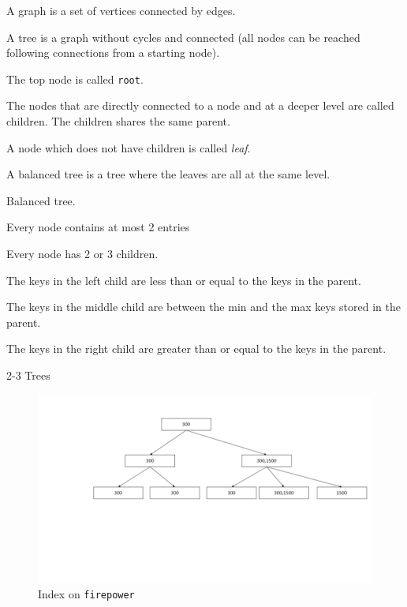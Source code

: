 \documentclass{beamer}
\begin{document}
\begin{slide}{
\item A graph is a set of vertices connected by edges.
\item A tree is a graph without cycles and connected (all nodes can be reached following connections from a starting node).
\item The top node is called \texttt{root}.
\item The nodes that are directly connected to a node and at a deeper level are called children. The children shares the same parent.
\item A node which does not have children is called \textit{leaf}.
\item A balanced tree is a tree where the leaves are all at the same level.
}\end{slide}

\begin{slide}{
\item Balanced tree.
\item Every node contains at most 2 entries
\item Every node has 2 or 3 children.
\item The keys in the left child are less than or equal to the keys in the parent.
\item The keys in the middle child are between the min and the max keys stored in the parent.
\item The keys in the right child are greater than or equal to the keys in the parent.
}\end{slide}

\begin{frame}{2-3 Trees}
\begin{figure}
\centering
\includegraphics[scale=0.3]{img/tree2}
\caption{Index on \texttt{firepower}}
\end{figure}
\end{frame}
\end{document}
